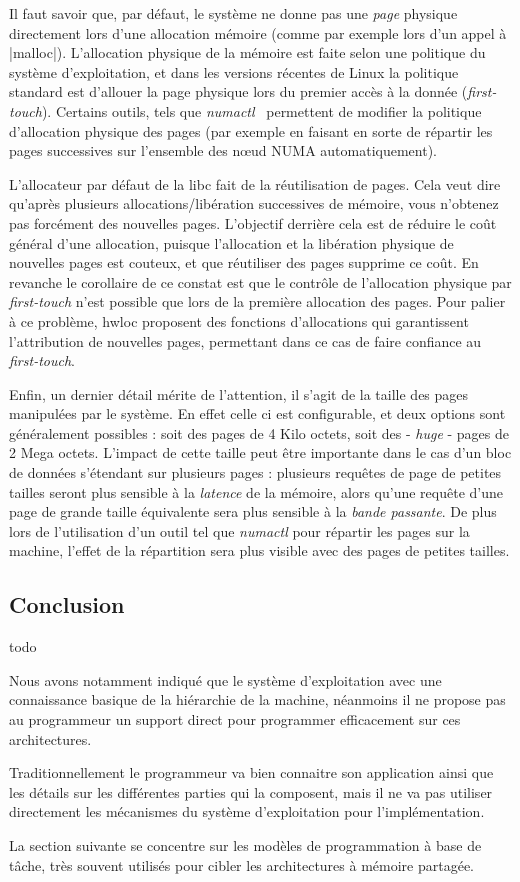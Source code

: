 Il faut savoir que, par défaut, le système ne donne pas une \emph{page} physique directement lors d'une allocation mémoire (comme par exemple lors d'un appel à |malloc|).
L'allocation physique de la mémoire est faite selon une politique du système d'exploitation, et dans les versions récentes de Linux la politique standard est d'allouer la page physique lors du premier accès à la donnée (\emph{first-touch}).
Certains outils, tels que \emph{numactl}~\cite{numactl} permettent de modifier la politique d'allocation physique des pages (par exemple en faisant en sorte de répartir les pages successives sur l'ensemble des nœud NUMA automatiquement).

L'allocateur par défaut de la libc fait de la réutilisation de pages. Cela veut dire qu'après plusieurs allocations/libération successives de mémoire, vous n'obtenez pas forcément des nouvelles pages.
L'objectif derrière cela est de réduire le coût général d'une allocation, puisque l'allocation et la libération physique de nouvelles pages est couteux, et que réutiliser des pages supprime ce coût.
En revanche le corollaire de ce constat est que le contrôle de l'allocation physique par \emph{first-touch} n'est possible que lors de la première allocation des pages.
Pour palier à ce problème, hwloc proposent des fonctions d'allocations qui garantissent l'attribution de nouvelles pages, permettant dans ce cas de faire confiance au \emph{first-touch}.

Enfin, un dernier détail mérite de l'attention, il s'agit de la taille des pages manipulées par le système.
En effet celle ci est configurable, et deux options sont généralement possibles : soit des pages de 4 Kilo octets, soit des - \emph{huge} - pages de 2 Mega octets.
L'impact de cette taille peut être importante dans le cas d'un bloc de données s'étendant sur plusieurs pages : plusieurs requêtes de page de petites tailles seront plus sensible à la \emph{latence} de la mémoire, alors qu'une requête d'une page de grande taille équivalente sera plus sensible à la \emph{bande passante}.
De plus lors de l'utilisation d'un outil tel que \emph{numactl} pour répartir les pages sur la machine, l'effet de la répartition sera plus visible avec des pages de petites tailles.


\subsection*{Conclusion}
\begin{todo}
  todo

Nous avons notamment indiqué que le système d'exploitation avec une connaissance basique de la hiérarchie de la machine, néanmoins il ne propose pas au programmeur un support direct pour programmer efficacement sur ces architectures.

Traditionnellement le programmeur va bien connaitre son application ainsi que les détails sur les différentes parties qui la composent, mais il ne va pas utiliser directement les mécanismes du système d'exploitation pour l'implémentation.

La section suivante se concentre sur les modèles de programmation à base de tâche, très souvent utilisés pour cibler les architectures à mémoire partagée.
\end{todo}
